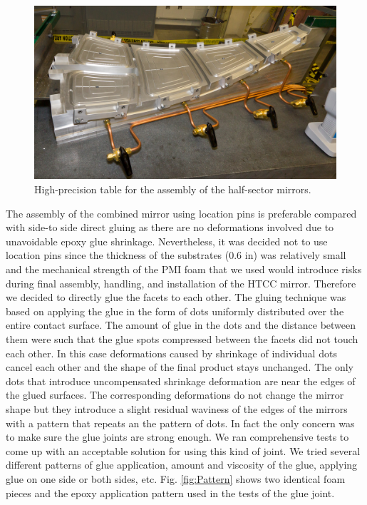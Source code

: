 \begin{figure}[ht]
    \centering
    \includegraphics[width=1.0\linewidth]{images/Half-sector_assem_tb2.JPG}
    \caption{High-precision table for the assembly of the half-sector mirrors.}
    \label{fig:Half-sector_assem_tb2}
\end{figure}

The assembly of the combined mirror using location pins is preferable compared with side-to side direct gluing as there are no deformations involved due to unavoidable epoxy glue shrinkage. Nevertheless, it was decided not to use location pins since the thickness of the substrates (0.6 in) was relatively small and the mechanical strength of the PMI foam that we used would introduce risks during final assembly, handling, and installation of the HTCC mirror. Therefore we decided to directly glue the facets to each other. The gluing technique was based on applying the glue in the form of dots uniformly distributed over the entire contact surface. The amount of glue in the dots and the distance between them were such that the glue spots compressed between the facets did not touch each other. In this case deformations caused by shrinkage of individual dots cancel each other and the shape of the final product stays unchanged. The only dots that introduce uncompensated shrinkage deformation are near the edges of the glued surfaces. The corresponding deformations do not change the mirror shape but they introduce a slight residual waviness of the edges of the mirrors with a pattern that repeats an the pattern of dots. In fact the only concern was to make sure the glue joints are strong enough. We ran comprehensive tests to come up with an acceptable solution for using this kind of joint. We  tried several different patterns of glue application, amount and viscosity of the glue, applying glue on one side or both sides, etc. Fig. \ref{fig:Pattern} shows two identical foam pieces and the epoxy application pattern used in the tests of the glue joint. 

